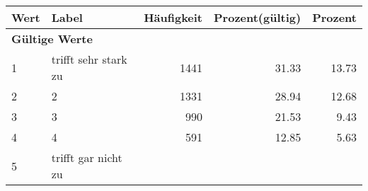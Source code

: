     \begin{longtable}{lXrrr}
     \toprule
     \textbf{Wert} & \textbf{Label} & \textbf{Häufigkeit} & \textbf{Prozent(gültig)} & \textbf{Prozent} \\
     \endhead
     \midrule
     \multicolumn{5}{l}{\textbf{Gültige Werte}}\\

     1 &
     \multicolumn{1}{X}{ trifft sehr stark zu   } &


       \num{1441} &
       \num[round-mode=places,round-precision=2]{31.33} &
         \num[round-mode=places,round-precision=2]{13.73} \\

     2 &
     \multicolumn{1}{X}{ 2   } &


       \num{1331} &
       \num[round-mode=places,round-precision=2]{28.94} &
         \num[round-mode=places,round-precision=2]{12.68} \\

     3 &
     \multicolumn{1}{X}{ 3   } &


       \num{990} &
       \num[round-mode=places,round-precision=2]{21.53} &
         \num[round-mode=places,round-precision=2]{9.43} \\

     4 &
     \multicolumn{1}{X}{ 4   } &


       \num{591} &
       \num[round-mode=places,round-precision=2]{12.85} &
         \num[round-mode=places,round-precision=2]{5.63} \\

     5 &
     \multicolumn{1}{X}{ trifft gar nicht zu   } &



\end{longtable}
